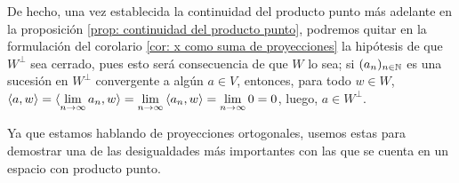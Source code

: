 \begin{nota}
De hecho, una vez establecida la continuidad
del producto punto más adelante en la
proposición \ref{prop: continuidad del producto punto}, podremos
quitar en la formulación del corolario 
\ref{cor: x como suma de proyecciones}
la hipótesis de que $W^{\perp}$ sea cerrado, pues esto
será consecuencia de que $W$ lo sea; si $(a_{n})_{n \in \mathbb{N}}$
es una sucesión en $W^{\perp}$ convergente a algún $a \in V$,
entonces, para todo $w \in W$,
$\langle a, w \rangle = 
\langle \lim\limits_{n \rightarrow \infty}{a_{n}}, w \rangle
= \lim\limits_{n \rightarrow \infty}{\langle a_{n},w \rangle}=
\lim\limits_{n \rightarrow \infty}{0}=0$,
luego, $a \in W^{\perp}$.
\end{nota}


\noindent Ya que estamos hablando de proyecciones ortogonales,
usemos estas para demostrar
una de las desigualdades
más importantes con las que se cuenta en un espacio
con producto punto.

